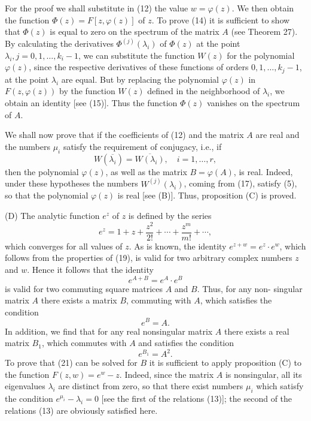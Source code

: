 \documentclass[10pt,a5paper]{book}
\makeatletter
\theoremstyle{plain}
\theoremstyle{definition}
\theoremstyle{remark}
\renewenvironment{proof}[1][\proofname]{\par
  \pushQED{\qed}%
  \normalfont\topsep6\p@\@plus6\p@\relax
  \trivlist
  \item\relax{\itshape #1\@addpunct{.}}\hspace\labelsep\ignorespaces
}{\popQED\endtrivlist\@endpefalse}
\makeatother
\begin{document}
\begin{proof}
For the proof we shall substitute in (12) the value $w=\varphi(z)$. We then obtain the function $\Phi(z)=F[z, \varphi(z)]$ of $z$. To prove (14) it is sufficient to show that $\Phi(z)$ is equal to zero on the spectrum of the matrix $A$ (see Theorem 27). By calculating the derivatives $\Phi^{(j)}\left(\lambda_{i}\right)$ of $\Phi(z)$ at the point $\lambda_{i}, j=0,1, \ldots, k_{i}-1$, we can substitute the function $W(z)$ for the polynomial $\varphi(z)$, since the respective derivatives of these functions of orders $0,1, \ldots, k_{j}-1$, at the point $\lambda_{i}$ are equal. But by replacing the polynomial $\varphi(z)$ in $F(z, \varphi(z))$ by the function $W(z)$ defined in the neighborhood of $\lambda_{i}$, we obtain an identity [see (15)]. Thus the function $\Phi(z)$ vanishes on the spectrum of $A$.

We shall now prove that if the coefficients of (12) and the matrix $A$ are real and the numbers $\mu_{i}$ satisfy the requirement of conjugacy, i.e., if
\[
W\left(\overline{\lambda_{i}}\right)=\overline{W\left(\lambda_{i}\right)}, \quad i=1, \ldots, r,
\]
then the polynomial $\varphi(z)$, as well as the matrix $B=\varphi(A)$, is real. Indeed, under these hypotheses the numbers $W^{(j)}\left(\lambda_{i}\right)$, coming from (17), satisfy (5), so that the polynomial $\varphi(z)$ is real [see (B)]. Thus, proposition (C) is proved.

(D) The analytic function $e^{z}$ of $z$ is defined by the series
\begin{equation*}
e^{z}=1+z+\frac{z^{2}}{2!}+\cdots+\frac{z^{m}}{m!}+\cdots, \tag{19}
\end{equation*}
which converges for all values of $z$. As is known, the identity $e^{z+w}=e^{z} \cdot e^{w}$, which follows from the properties of (19), is valid for two arbitrary complex numbers $z$ and $w$. Hence it follows that the identity
\begin{equation*}
e^{A+B}=e^{A} \cdot e^{B} \tag{20}
\end{equation*}
is valid for two commuting square matrices $A$ and $B$. Thus, for any non-
singular matrix $A$ there exists a matrix $B$, commuting with $A$, which satisfies the condition
\begin{equation*}
e^{B}=A . \tag{21}
\end{equation*}
In addition, we find that for any real nonsingular matrix $A$ there exists a real matrix $B_{1}$, which commutes with $A$ and satisfies the condition
\begin{equation*}
e^{B_{1}}=A^{2} . \tag{22}
\end{equation*}
To prove that (21) can be solved for $B$ it is sufficient to apply proposition (C) to the function $F(z, w)=e^{w}-z$. Indeed, since the matrix $A$ is nonsingular, all its eigenvalues $\lambda_{i}$ are distinct from zero, so that there exist numbers $\mu_{i}$ which satisfy the condition $e^{\mu_{i}}-\lambda_{i}=0$ [see the first of the relations (13)]; the second of the relations (13) are obviously satisfied here.


\end{proof}
\end{document}
